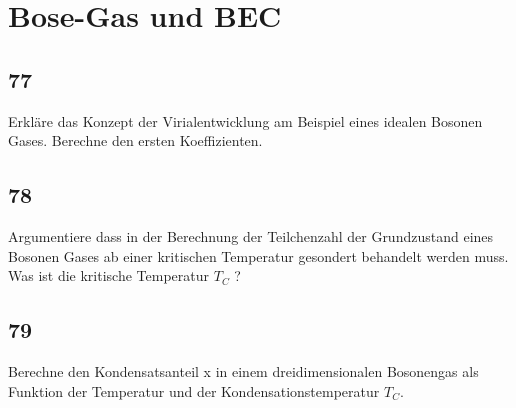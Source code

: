 \section{Bose-Gas und BEC}
\subsection{77}
\begin{myfrag}
Erkläre das Konzept der Virialentwicklung am Beispiel eines idealen
Bosonen Gases. Berechne den ersten Koeffizienten.
\end{myfrag}
\subsection{78}
\begin{myfrag}
Argumentiere dass in der Berechnung der Teilchenzahl der Grundzustand
eines Bosonen Gases ab einer kritischen Temperatur gesondert behandelt
werden muss. Was ist die kritische Temperatur  $T_C$ ?
\end{myfrag}
\subsection{79}
\begin{myfrag}
Berechne den Kondensatsanteil x in einem dreidimensionalen Bosonengas als
Funktion der Temperatur und der Kondensationstemperatur $T_C$.
\end{myfrag}